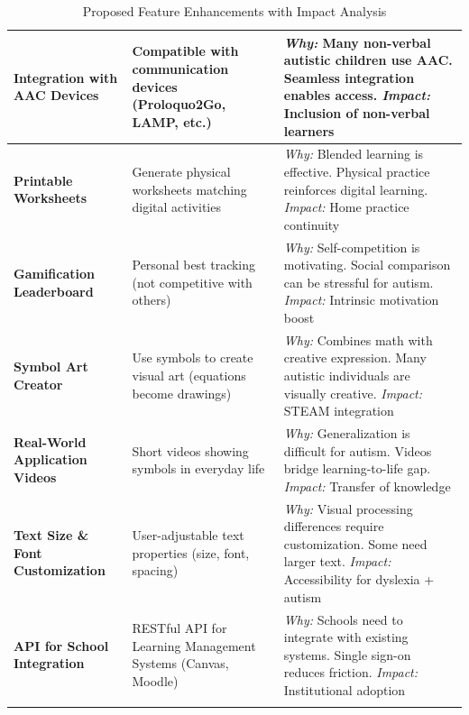 \documentclass[12pt, a4paper]{article}
\begin{document}
\begin{longtable}{|>{\raggedright}p{4cm}|>{\raggedright}p{5cm}|>{\raggedright\arraybackslash}p{5cm}|}
\textbf{Integration with AAC Devices} & Compatible with communication devices (Proloquo2Go, LAMP, etc.) & \textit{Why:} Many non-verbal autistic children use AAC. Seamless integration enables access. \newline \textit{Impact:} Inclusion of non-verbal learners \\
\hline

\textbf{Printable Worksheets} & Generate physical worksheets matching digital activities & \textit{Why:} Blended learning is effective. Physical practice reinforces digital learning. \newline \textit{Impact:} Home practice continuity \\
\hline

\textbf{Gamification Leaderboard} & Personal best tracking (not competitive with others) & \textit{Why:} Self-competition is motivating. Social comparison can be stressful for autism. \newline \textit{Impact:} Intrinsic motivation boost \\
\hline

\textbf{Symbol Art Creator} & Use symbols to create visual art (equations become drawings) & \textit{Why:} Combines math with creative expression. Many autistic individuals are visually creative. \newline \textit{Impact:} STEAM integration \\
\hline

\textbf{Real-World Application Videos} & Short videos showing symbols in everyday life & \textit{Why:} Generalization is difficult for autism. Videos bridge learning-to-life gap. \newline \textit{Impact:} Transfer of knowledge \\
\hline

\textbf{Text Size \& Font Customization} & User-adjustable text properties (size, font, spacing) & \textit{Why:} Visual processing differences require customization. Some need larger text. \newline \textit{Impact:} Accessibility for dyslexia + autism \\
\hline

\textbf{API for School Integration} & RESTful API for Learning Management Systems (Canvas, Moodle) & \textit{Why:} Schools need to integrate with existing systems. Single sign-on reduces friction. \newline \textit{Impact:} Institutional adoption \\
\hline

\caption{Proposed Feature Enhancements with Impact Analysis}
\end{longtable}
\end{document}
